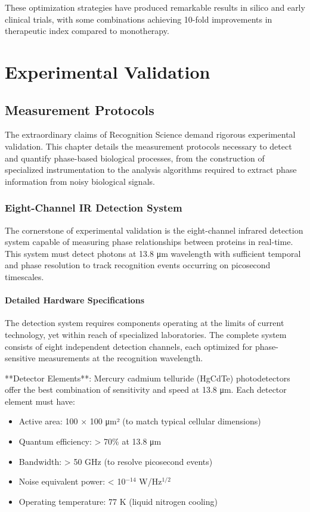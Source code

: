 \documentclass[12pt,a4paper]{report}
\begin{document}
These optimization strategies have produced remarkable results in silico and early clinical trials, with some combinations achieving 10-fold improvements in therapeutic index compared to monotherapy.

\part{Experimental Validation}

\chapter{Measurement Protocols}

The extraordinary claims of Recognition Science demand rigorous experimental validation. This chapter details the measurement protocols necessary to detect and quantify phase-based biological processes, from the construction of specialized instrumentation to the analysis algorithms required to extract phase information from noisy biological signals.

\section{Eight-Channel IR Detection System}

The cornerstone of experimental validation is the eight-channel infrared detection system capable of measuring phase relationships between proteins in real-time. This system must detect photons at 13.8 μm wavelength with sufficient temporal and phase resolution to track recognition events occurring on picosecond timescales.

\subsection{Detailed Hardware Specifications}

The detection system requires components operating at the limits of current technology, yet within reach of specialized laboratories. The complete system consists of eight independent detection channels, each optimized for phase-sensitive measurements at the recognition wavelength.

**Detector Elements**: Mercury cadmium telluride (HgCdTe) photodetectors offer the best combination of sensitivity and speed at 13.8 μm. Each detector element must have:

\begin{itemize}
\item Active area: 100 × 100 μm² (to match typical cellular dimensions)
\item Quantum efficiency: > 70\% at 13.8 μm
\item Bandwidth: > 50 GHz (to resolve picosecond events)
\item Noise equivalent power: < 10$^{-14}$ W/Hz$^{1/2}$
\item Operating temperature: 77 K (liquid nitrogen cooling)
\end{itemize}
\end{document}
